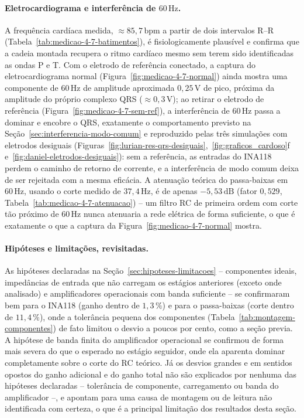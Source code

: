 \documentclass[11pt,a4paper]{article}
\begin{document}
\paragraph{Eletrocardiograma e interferência de \(60\,\text{Hz}\).} A frequência cardíaca medida, \(\approx85{,}7\,\text{bpm}\) a partir de dois intervalos R--R (Tabela~\ref{tab:medicao-4-7-batimentos}), é fisiologicamente plausível e confirma que a cadeia montada recupera o ritmo cardíaco mesmo sem terem sido identificadas as ondas P e T. Com o eletrodo de referência conectado, a captura do eletrocardiograma normal (Figura~\ref{fig:medicao-4-7-normal}) ainda mostra uma componente de \(60\,\text{Hz}\) de amplitude aproximada \(0{,}25\,\text{V}\) de pico, próxima da amplitude do próprio complexo QRS (\(\approx0{,}3\,\text{V}\)); ao retirar o eletrodo de referência (Figura~\ref{fig:medicao-4-7-sem-ref}), a interferência de \(60\,\text{Hz}\) passa a dominar e encobre o QRS, exatamente o comportamento previsto na Seção~\ref{sec:interferencia-modo-comum} e reproduzido pelas três simulações com eletrodos desiguais (Figuras~\ref{fig:lurian-res-qrs-desiguais},~\ref{fig:graficos_cardoso}f e~\ref{fig:daniel-eletrodos-desiguais}): sem a referência, as entradas do INA118 perdem o caminho de retorno de corrente, e a interferência de modo comum deixa de ser rejeitada com a mesma eficácia. A atenuação teórica do passa-baixas em \(60\,\text{Hz}\), usando o corte medido de \(37{,}4\,\text{Hz}\), é de apenas \(-5{,}53\,\text{dB}\) (fator \(0{,}529\), Tabela~\ref{tab:medicao-4-7-atenuacao}) -- um filtro RC de primeira ordem com corte tão próximo de \(60\,\text{Hz}\) nunca atenuaria a rede elétrica de forma suficiente, o que é exatamente o que a captura da Figura~\ref{fig:medicao-4-7-normal} mostra.

\paragraph{Hipóteses e limitações, revisitadas.} As hipóteses declaradas na Seção~\ref{sec:hipoteses-limitacoes} -- componentes ideais, impedâncias de entrada que não carregam os estágios anteriores (exceto onde analisado) e amplificadores operacionais com banda suficiente -- se confirmaram bem para o INA118 (ganho dentro de \(1{,}3\,\%\)) e para o passa-baixas (corte dentro de \(11{,}4\,\%\)), onde a tolerância pequena dos componentes (Tabela~\ref{tab:montagem-componentes}) de fato limitou o desvio a poucos por cento, como a seção previa. A hipótese de banda finita do amplificador operacional se confirmou de forma mais severa do que o esperado no estágio seguidor, onde ela aparenta dominar completamente sobre o corte do RC teórico. Já os desvios grandes e em sentidos opostos do ganho adicional e do ganho total não são explicados por nenhuma das hipóteses declaradas -- tolerância de componente, carregamento ou banda do amplificador --, e apontam para uma causa de montagem ou de leitura não identificada com certeza, o que é a principal limitação dos resultados desta seção.
\end{document}
